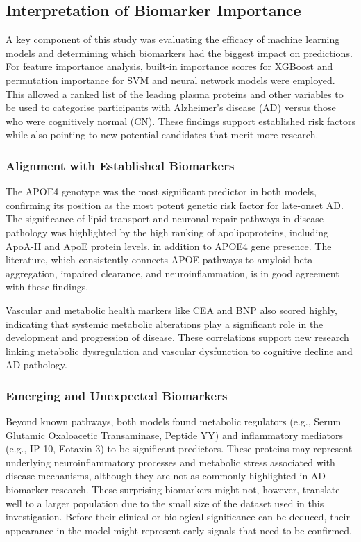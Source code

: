 \documentclass[a4paper,12pt]{article}
\begin{document}
\subsection{Interpretation of Biomarker Importance}
A key component of this study was evaluating the efficacy of machine learning models and determining which biomarkers had the biggest impact on predictions. For feature importance analysis, built-in importance scores for XGBoost and permutation importance for SVM and neural network models were employed. This allowed a ranked list of the leading plasma proteins and other variables to be used to categorise participants with Alzheimer's disease (AD) versus those who were cognitively normal (CN). These findings support established risk factors while also pointing to new potential candidates that merit more research.

\subsubsection{Alignment with Established Biomarkers}

The APOE4 genotype was the most significant predictor in both models, confirming its position as the most potent genetic risk factor for late-onset AD.  The significance of lipid transport and neuronal repair pathways in disease pathology was highlighted by the high ranking of apolipoproteins, including ApoA-II and ApoE protein levels, in addition to APOE4 gene presence.  The literature, which consistently connects APOE pathways to amyloid-beta aggregation, impaired clearance, and neuroinflammation, is in good agreement with these findings.

Vascular and metabolic health markers like CEA and BNP also scored highly, indicating that systemic metabolic alterations play a significant role in the development and progression of disease.  These correlations support new research linking metabolic dysregulation and vascular dysfunction to cognitive decline and AD pathology.

\subsubsection{Emerging and Unexpected Biomarkers}

Beyond known pathways, both models found metabolic regulators (e.g., Serum Glutamic Oxaloacetic Transaminase, Peptide YY) and inflammatory mediators (e.g., IP-10, Eotaxin-3) to be significant predictors.  These proteins may represent underlying neuroinflammatory processes and metabolic stress associated with disease mechanisms, although they are not as commonly highlighted in AD biomarker research.  These surprising biomarkers might not, however, translate well to a larger population due to the small size of the dataset used in this investigation.  Before their clinical or biological significance can be deduced, their appearance in the model might represent early signals that need to be confirmed.
\end{document}
